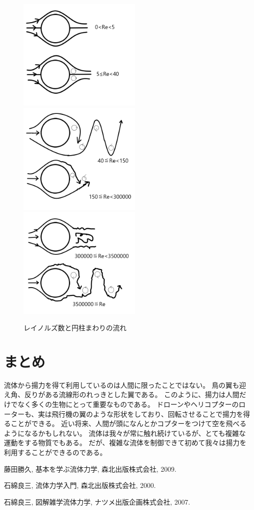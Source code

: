 \documentclass[10pt,b5paper,papersize,dvipdfmx]{jsbook}
\begin{document}
\begin{figure}[ht]
  \centering
  \includegraphics[width=60mm]{img/ryuutai10.png}
  \centering
  \includegraphics[width=60mm]{img/ryuutai11.png}
  \centering
  \includegraphics[width=60mm]{img/ryuutai12.png}
  \caption{レイノルズ数と円柱まわりの流れ}
\end{figure}
\section{まとめ}
流体から揚力を得て利用しているのは人間に限ったことではない。
鳥の翼も迎え角、反りがある流線形のれっきとした翼である。
このように、揚力は人間だけでなく多くの生物にとって重要なものである。
ドローンやヘリコプターのローターも、実は飛行機の翼のような形状をしており、回転させることで揚力を得ることができる。
近い将来、人間が頭になんとかコプターをつけて空を飛べるようになるかもしれない。
流体は我々が常に触れ続けているが、とても複雑な運動をする物質でもある。
だが、複雑な流体を制御できて初めて我々は揚力を利用することができるのである。

\begin{thebibliography}{99}
  \item 藤田勝久, 基本を学ぶ流体力学, 森北出版株式会社, 2009.
  \item 石綿良三, 流体力学入門, 森北出版株式会社, 2000.
  \item 石綿良三, 図解雑学流体力学, ナツメ出版企画株式会社, 2007.
\end{thebibliography}
\end{document}
